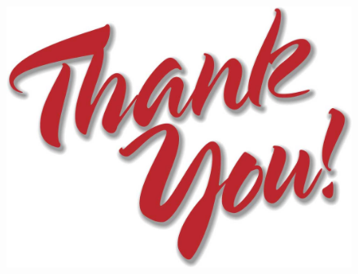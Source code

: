 \documentclass{article}
\begin{document}
\begin{landscape}
\begin{figure}[H]
	\centering
	\includegraphics[width=\linewidth]{thankyou}
\end{figure}

\end{landscape}
\end{document}
